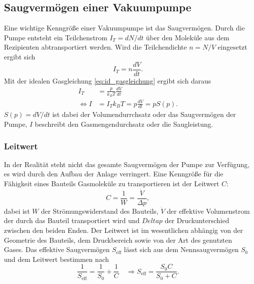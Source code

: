 \subsection{Saugvermögen einer Vakuumpumpe}
Eine wichtige Kenngröße einer Vakuumpumpe ist das Saugvermögen.
Durch die Pumpe entsteht ein Teilchenstrom $I_T = dN/dt$ über den Moleküle aus dem Rezipienten abtransportiert werden.
Wird die Teilchendichte $n = N/V$ eingesetzt ergibt sich
\begin{equation}
    I_T = n \frac{dV}{dt} .
\end{equation}
Mit der idealen Gasgleichung \eqref{eq:id_gasgleichung} ergibt sich daraus
\begin{align}
    I_T &= \frac{p}{k_B T} \frac{dV}{dt} \\
    \Leftrightarrow I &= I_T k_B T = p \frac{dV}{dt} = p S(p) .
\end{align}
$S(p) = dV/dt$ ist dabei der Volumendurrchsatz oder das Saugvermögen der Pumpe, $I$ beschreibt den Gasmengendurchsatz oder die Saugleistung.\cite{V070_glossar}

\subsubsection{Leitwert}
In der Realität steht nicht das gesamte Saugvermögen der Pumpe zur Verfügung, es wird durch den Aufbau der Anlage verringert.
Eine Kenngröße für die Fähigkeit eines Bauteils Gasmoleküle zu transportieren ist der Leitwert $C$:
\begin{equation}
    C =\frac{1}{W} = \frac{\dot V}{\Delta p} ,
\end{equation}
dabei ist $W$ der Strömungswiderstand des Bauteils, $\dot V$ der effektive Volumenstrom der durch das Bauteil transportiert wird und $Delta p$ der Druckunterschied zwischen den beiden
Enden.
Der Leitwert ist im wesentlichen abhängig von der Geometrie des Bauteils, dem Druckbereich sowie von der Art des genutzten Gases.
Das effektive Saugvermögen $S_\text{eff}$ lässt sich aus dem Nennsaugvermögen $S_0$ und dem Leitwert bestimmen nach
\begin{equation}
    \label{eq:leitwert}
    \frac{1}{S_\text{eff}} = \frac{1}{S_0} + \frac{1}{C} \quad \Rightarrow S_\text{eff} = \frac{S_0 C}{S_0 +C} .
\end{equation}
\cite{V070_glossar}
